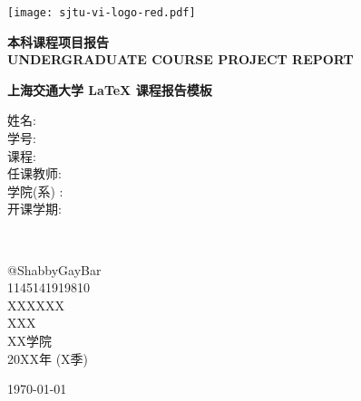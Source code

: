 \thispagestyle{empty}

\begin{titlepage}
	\begin{center}
		\texttt{[image: sjtu-vi-logo-red.pdf]}
		\vspace*{1cm}

		\huge
		\textbf{本科课程项目报告} \\
		\Large
		\textbf{UNDERGRADUATE COURSE PROJECT REPORT}

		\vspace{2cm}
		\LARGE
		\textbf{上海交通大学 \LaTeX{} 课程报告模板} \\

		\vfill

		\large
		\begin{minipage}{0.2\textwidth}
			\begin{flushleft}
				\Large
				姓\qquad 名: \\
				学\qquad 号: \\
				课\qquad 程: \\
				任课教师: \\
				学院(系) : \\
				开课学期: 
			\end{flushleft}
		\end{minipage}
		~
		\begin{minipage}{0.7\textwidth}
			\begin{center}
				\Large
				@ShabbyGayBar \\
				1145141919810 \\
				XXXXXX \\
				XXX \\
				XX学院 \\
				20XX年 (X季)
			\end{center}
		\end{minipage}
		
		\vspace{1cm}
		\Large
		\today
	\end{center}
\end{titlepage}
